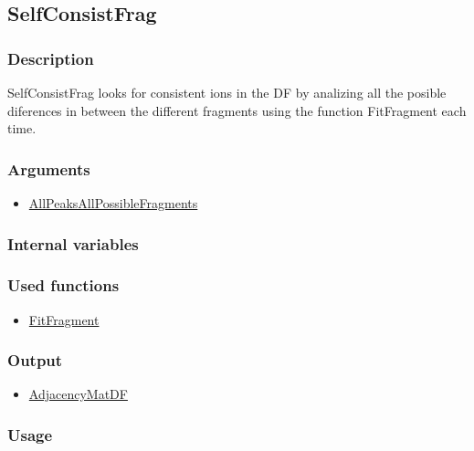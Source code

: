 \subsection{SelfConsistFrag}\label{SelfConsistFrag}
\subsubsection{Description}
SelfConsistFrag looks for consistent ions in the DF by analizing all the posible diferences in between the different fragments using the function FitFragment each time.
\subsubsection{Arguments}
\begin{itemize}
\item \hyperref[AllPeaksAllPossibleFragments]{AllPeaksAllPossibleFragments}
\end{itemize}
\subsubsection{Internal variables}
\subsubsection{Used functions}
\begin{itemize}
\item \hyperref[FitFragment]{FitFragment}
\end{itemize}
\subsubsection{Output}
\begin{itemize}
\item \hyperref[AdjacencyMatDF]{AdjacencyMatDF} %
\end{itemize}
\subsubsection{Usage}


